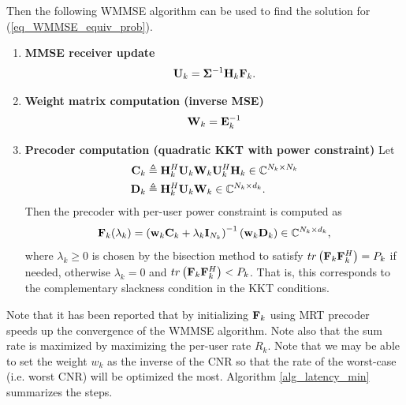\documentclass[a4paper, 12pt, onecolumn, journal, twoside, draftclsnofoot]{IEEEtran}
\begin{document}
Then the following WMMSE algorithm can be used to find the solution for (\ref{eq_WMMSE_equiv_prob}).  
\begin{enumerate}[1.]
	\item {\bf MMSE receiver update}
	\begin{equation*}
		{\bf U}_k = {\boldsymbol{\Sigma} }^{-1} {\bf H}_k {\bf F}_k.
	\end{equation*}
	\item {\bf Weight matrix computation (inverse MSE)}
	\begin{equation*}
		{\bf W}_k = {\bf E}_k^{-1}
	\end{equation*}
	\item {\bf Precoder computation (quadratic KKT with power constraint)} Let 
	\begin{align*}
		{\bf C}_k &\triangleq {\bf H}_k^H {\bf U}_k {\bf W}_k {\bf U}_k^H {\bf H}_k \in \mathbb{C}^{N_k \times N_k} \\
		{\bf D}_k &\triangleq {\bf H}_k^H {\bf U}_k {\bf W}_k \in \mathbb{C}^{N_k \times d_k}.
	\end{align*} 
	Then the precoder with per-user power constraint is computed as
	\begin{equation*}
		{\bf F}_k(\lambda_k) = \left( {\bf w}_k {\bf C}_k + \lambda_k {\bf I}_{N_k} \right)^{-1}  ({\bf w}_k {\bf D}_k ) \in \mathbb{C}^{N_k \times d_k}, 
	\end{equation*}
	where $\lambda_k \geq 0$ is chosen by the bisection method to satisfy $tr\left( {\bf F}_k {\bf F}_k^H \right) = P_k$ if needed, otherwise $\lambda_k = 0$ and $tr\left( {\bf F}_k {\bf F}_k^H \right) < P_k$.  That is, this corresponds to the complementary slackness condition in the KKT conditions.
\end{enumerate}
Note that it has been reported that by initializing ${\bf F}_k$ using MRT precoder speeds up the convergence of the WMMSE algorithm.  Note also that the sum rate is maximized by maximizing the per-user rate $R_k$.  Note that we may be able to set the weight $w_k$ as the inverse of the CNR so that the rate of the worst-case (i.e. worst CNR) will be optimized the most.  Algorithm \ref{alg_latency_min} summarizes the steps. \\
\end{document}
